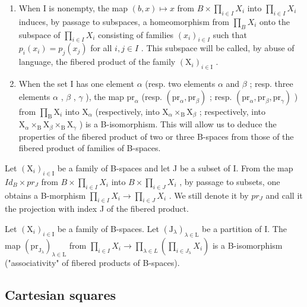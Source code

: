 \begin{enumerate}
\def\labelenumi{\arabic{enumi})}
\setcounter{enumi}{1}
\item
  When I is nonempty, the map \((b,x)\mapsto x\) from \(B\times\prod_{i\in I}X_{i}\) into \(\prod_{i\in I}X_{i}\) induces, by passage to subspaces, a homeomorphism from \(\prod_{B}X_{i}\) onto the subspace of \(\prod_{i\in I}X_{i}\) consisting of families \((x_{i})_{i\in I}\) such that \(p_{i}(x_{i})=p_{j}(x_{j})\) for all \(i,j\in I\) . This subspace will be called, by abuse of language, the fibered product of the family \((\mathrm{X}_{i})_{i\in\mathrm{I}}\) .
\item
  When the set I has one element \(\alpha\) (resp. two elements \(\alpha\) and \(\beta\) ; resp. three elements \(\alpha\) , \(\beta\) , \(\gamma\) ), the map \(\mathrm{pr}_{\alpha}\) (resp. \((\mathrm{pr}_{\alpha}, \mathrm{pr}_{\beta})\) ; resp. \((\mathrm{pr}_{\alpha}, \mathrm{pr}_{\beta}, \mathrm{pr}_{\gamma})\) ) from \(\prod_{\mathrm{B}} \mathrm{X}_i\) into \(\mathrm{X}_{\alpha}\) (respectively, into \(\mathrm{X}_{\alpha} \times_{\mathrm{B}} \mathrm{X}_{\beta}\) ; respectively, into \(\mathrm{X}_{\alpha} \times_{\mathrm{B}} \mathrm{X}_{\beta} \times_{\mathrm{B}} \mathrm{X}_{\gamma}\) ) is a B-isomorphism. This will allow us to deduce the properties of the fibered product of two or three B-spaces from those of the fibered product of families of B-spaces.
\end{enumerate}

Let \((\mathrm{X}_{i})_{i\in\mathrm{I}}\) be a family of B-spaces and let J be a subset of I. From the map \(Id_{B}\times pr_{J}\) from \(B\times\prod_{i\in I}X_{i}\) into \(B\times\prod_{i\in J}X_{i}\) , by passage to subsets, one obtains a B-morphism \(\prod_{i\in I}X_{i}\to\prod_{i\in J}X_{i}\) . We still denote it by \(pr_{J}\) and call it the projection with index J of the fibered product.

Let \((\mathrm{X}_{i})_{i\in\mathrm{I}}\) be a family of B-spaces. Let \((\mathrm{J}_{\lambda})_{\lambda\in\mathrm{L}}\) be a partition of I. The map \((\mathrm{pr}_{\mathrm{J}_{\lambda}})_{\lambda\in\mathrm{L}}\) from \(\prod_{i\in I}X_{i}\to\prod_{\lambda\in L}\left(\prod_{i\in J_{\lambda}}X_{i}\right)\) is a B-isomorphism ("associativity" of fibered products of B-spaces).

\subsection{Cartesian squares}


